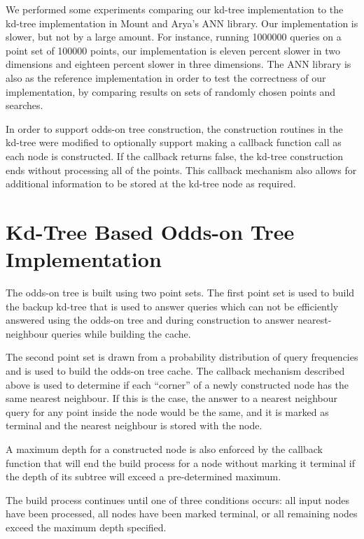\documentclass[mcs]{scsthesis}
\begin{document}
We performed some experiments comparing our kd-tree implementation to the 
kd-tree implementation in Mount and Arya's ANN library\cite{ann}. Our
implementation is slower, but not by a large amount. For instance, running
1000000 queries on a point set of 100000 points, our implementation is eleven
percent slower in two dimensions and eighteen percent slower in three
dimensions. The ANN library is also as the reference implementation in order
to test the correctness of our implementation, by comparing results on sets
of randomly chosen points and searches.

In order to support odds-on tree construction, the construction routines in
the kd-tree were modified to optionally support making a callback function
call as each node is constructed. If the callback returns false, the kd-tree
construction ends without processing all of the points. This callback
mechanism also allows for additional information to be stored at the kd-tree
node as required. 

\section{Kd-Tree Based Odds-on Tree Implementation}

The odds-on tree is built using two point sets. The first point set is used
to build the backup kd-tree that is used to answer queries which can not be
efficiently answered using the odds-on tree and during construction to
answer nearest-neighbour queries while building the cache.

The second point set is drawn from a probability distribution of query
frequencies and is used to build the odds-on tree cache. The callback mechanism
described above is used to determine if each ``corner'' of a newly constructed
node has the same nearest neighbour. If this is the case, the answer to a
nearest neighbour query for any point inside the node would be the same, and it
is marked as terminal and the nearest neighbour is stored with the node.

A maximum depth for a constructed node is also enforced by the callback
function that will end the build process for a node without marking it
terminal if the depth of its subtree will exceed a pre-determined maximum.

The build process continues until one of three conditions occurs: all input nodes
have been processed, all nodes have been marked terminal, or all remaining nodes
exceed the maximum depth specified.
\end{document}
